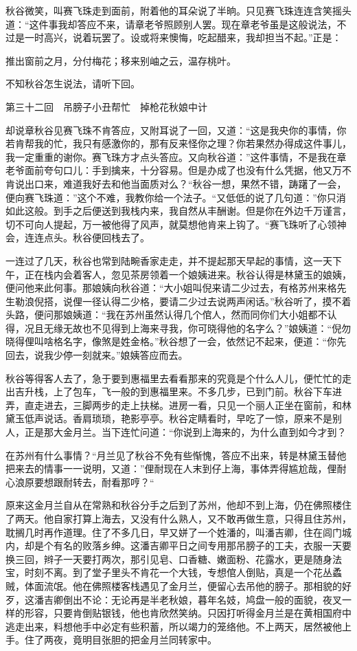\documentclass[12pt,UTF8]{ctexbook}
\begin{document}
{{{秋谷微笑，叫赛飞珠走到面前，附着他的耳朵说了半晌。只见赛飞珠连连含笑摇头道：“这件事我却答应不来，请章老爷照顾别人罢。现在章老爷虽是这般说法，不过是一时高兴，说着玩罢了。设或将来懊悔，吃起醋来，我却担当不起。”正是：

推出窗前之月，分付梅花；移来别岫之云，温存桃叶。

不知秋谷怎生说法，请听下回。





第三十二回　吊膀子小丑帮忙　掉枪花秋娘中计





却说章秋谷见赛飞珠不肯答应，又附耳说了一回，又道：“这是我央你的事情，你若肯帮我的忙，我只有感激你的，那有反来怪你之理？你若果然办得成这件事儿，我一定重重的谢你。赛飞珠方才点头答应。又向秋谷道：”这件事情，不是我在章老爷面前夸句口儿：手到擒来，十分容易。但是办成了也没有什么凭据，他又万不肯说出口来，难道我好去和他当面质对么？“秋谷一想，果然不错，踌躇了一会，便向赛飞珠道：”这个不难，我教你给一个法子。“又低低的说了几句道：”你只消如此这般。到手之后便送到我栈内来，我自然从丰酬谢。但是你在外边千万谨言，切不可向人提起，万一被他得了风声，就莫想他肯来上钩了。“赛飞珠听了心领神会，连连点头。秋谷便回栈去了。

一连过了几天，秋谷也常到陆畹香家走走，并不提起那天早起的事情，这一天下午，正在栈内会着客人，忽见茶房领着一个娘姨进来。秋谷认得是林黛玉的娘姨，便问他来此何事。那娘姨向秋谷道：“大小姐叫倪来请二少过去，有格苏州来格先生勒浪倪搭，说俚一径认得二少格，要请二少过去说两声闲话。”秋谷听了，摸不着头路，便问那娘姨道：“我在苏州虽然认得几个倌人，然而同你们大小姐都不认得，况且无缘无故也不见得到上海来寻我，你可晓得他的名字么？”娘姨道：“倪勿晓得俚叫啥格名字，像煞是姓金格。”秋谷想了一会，依然记不起来，便道：“你先回去，说我少停一刻就来。”娘姨答应而去。

秋谷等得客人去了，急于要到惠福里去看看那来的究竟是个什么人儿，便忙忙的走出吉升栈，上了包车，飞一般的到惠福里来。不多几步，已到门前。秋谷下车进弄，直走进去，三脚两步的走上扶梯。进房一看，只见一个丽人正坐在窗前，和林黛玉低声说话。香肩琐琐，艳影亭亭。秋谷定睛看时，早吃了一惊，原来不是别人，正是那大金月兰。当下连忙问道：“你说到上海来的，为什么直到如今才到？

在苏州有什么事情？“月兰见了秋谷不免有些惭愧，答应不出来，转是林黛玉替他把来去的情事一一说明，又道：”俚耐现在人末到仔上海，事体弄得尴尬哉，俚耐心浪原要想跟耐转去，耐看那哼？“

原来这金月兰自从在常熟和秋谷分手之后到了苏州，他却不到上海，仍在佛照楼住了两天。他自家打算上海去，又没有什么熟人，又不敢再做生意，只得且住苏州，耽搁几时再作道理。住了不多几日，早又姘了一个姓潘的，叫潘吉卿，住在闾门城内，却是个有名的败落乡绅。这潘吉卿平日之间专用那吊膀子的工夫，衣服一天要换三回，辫子一天要打两次，那引见皂、口香糖、嫩面粉、花露水，更是随身法宝，时刻不离。到了堂子里头不肯花一个大钱，专想倌人倒贴，真是一个花丛蟊贼，体面流氓。他在佛照楼客栈遇见了金月兰，便留心去吊他的膀子。那相貌的好歹，这潘吉卿倒出不论：无论再是半老秋娘，暮年名妓，鸠盘一般的面貌，夜叉一样的形容，只要肯倒贴银钱，他也肯欣然笑纳。只因打听得金月兰是在黄相国府中逃走出来，料想他手中必定有些积蓄，所以竭力的笼络他。不上两天，居然被他上手。住了两夜，竟明目张胆的把金月兰同转家中。

}}}
\end{document}
